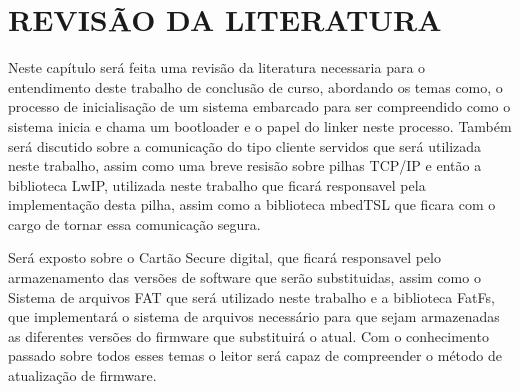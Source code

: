 
\chapter{REVISÃO DA LITERATURA}
\label{chap:fundamentacaoTeorica}
Neste capítulo será feita uma revisão da literatura necessaria para o entendimento deste trabalho de conclusão de curso, abordando os temas como, o processo de inicialisação de um sistema embarcado para ser compreendido como o sistema inicia e chama um bootloader e o papel do linker neste processo. Também será discutido sobre a comunicação do tipo cliente servidos que será utilizada neste trabalho, assim como uma breve resisão sobre pilhas TCP/IP e então a biblioteca LwIP, utilizada neste trabalho que ficará responsavel pela implementação desta pilha, assim como a biblioteca mbedTSL que ficara com o cargo de tornar essa comunicação segura.

Será exposto sobre o Cartão Secure digital, que ficará responsavel pelo armazenamento das versões de software que serão substituidas, assim como o Sistema de arquivos FAT que será utilizado neste trabalho e a biblioteca FatFs, que implementará o sistema de arquivos necessário para que sejam armazenadas as diferentes versões do firmware que substituirá o atual. Com o conhecimento passado sobre todos esses temas o leitor será capaz de compreender o método de atualização de firmware.


